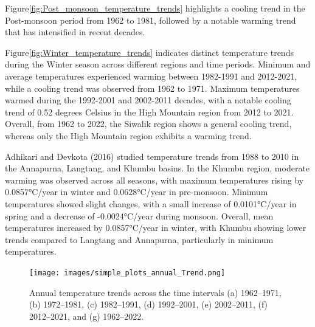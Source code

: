 Figure\ref{fig:Post_monsoon_temperature_trends} highlights a cooling trend in the Post-monsoon period from 1962 to 1981, followed by a notable warming trend that has intensified in recent decades.

Figure\ref{fig:Winter_temperature_trends} indicates distinct temperature trends during the Winter season across different regions and time periods. Minimum and average temperatures experienced warming between 1982-1991 and 2012-2021, while a cooling trend was observed from 1962 to 1971. Maximum temperatures warmed during the 1992-2001 and 2002-2011 decades, with a notable cooling trend of 0.52 degrees Celsius in the High Mountain region from 2012 to 2021. Overall, from 1962 to 2022, the Siwalik region shows a general cooling trend, whereas only the High Mountain region exhibits a warming trend.

\textcite{adhikari_x_2016}Adhikari and Devkota (2016) studied temperature trends from 1988 to 2010 in the Annapurna, Langtang, and Khumbu basins. In the Khumbu region, moderate warming was observed across all seasons, with maximum temperatures rising by 0.0857°C/year in winter and 0.0628°C/year in pre-monsoon. Minimum temperatures showed slight changes, with a small increase of 0.0101°C/year in spring and a decrease of -0.0024°C/year during monsoon. Overall, mean temperatures increased by 0.0857°C/year in winter, with Khumbu showing lower trends compared to Langtang and Annapurna, particularly in minimum temperatures.

\begin{figure}[H] 
  \centering
  \texttt{[image: images/simple\_plots\_annual\_Trend.png]}  
  \caption{Annual temperature trends across the time intervals (a) 1962–1971, (b) 1972–1981, (c) 1982–1991, (d) 1992–2001, (e) 2002–2011, (f) 2012–2021, and (g) 1962–2022.} 
  \label{fig:Annual temperature trends}  
\end{figure}


